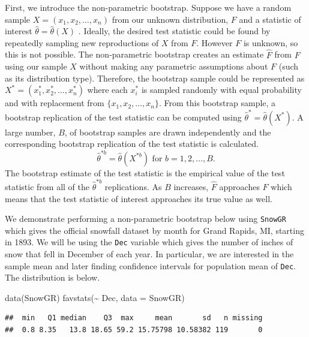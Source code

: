 \documentclass[12pt]{article}
\newenvironment{Shaded}{\begin{snugshade}}{\end{snugshade}}
\newcommand{\AttributeTok}[1]{\textcolor[rgb]{0.77,0.63,0.00}{#1}}
\newcommand{\FunctionTok}[1]{\textcolor[rgb]{0.00,0.00,0.00}{#1}}
\newcommand{\NormalTok}[1]{#1}
\newcommand{\SpecialCharTok}[1]{\textcolor[rgb]{0.00,0.00,0.00}{#1}}
\begin{document}
First, we introduce the non-parametric bootstrap. Suppose we have a
random sample \(X = (x_1,x_2,\dots,x_n)\) from our unknown distribution,
\(F\) and a statistic of interest \(\hat{\theta} = \hat{\theta}(X)\)
\citep{EfronCasi}. Ideally, the desired test statistic could be found by
repeatedly sampling new reproductions of \(X\) from \(F\). However \(F\)
is unknown, so this is not possible. The non-parametric bootstrap
creates an estimate \(\hat{F}\) from \(F\) using our sample \(X\)
without making any parametric assumptions about \(F\) (such as its
distribution type). Therefore, the bootstrap sample could be represented
as \(X^* = (x^*_1, x^*_2, \dots, x^*_n)\) where each \(x^*_i\) is
sampled randomly with equal probability and with replacement from
\(\{x_1,x_2,\dots,x_n\}\). From this bootstrap sample, a bootstrap
replication of the test statistic can be computed using
\(\hat{\theta}^* = \hat{\theta}(X^*)\). A large number, \(B\), of
bootstrap samples are drawn independently and the corresponding
bootstrap replication of the test statistic is calculated.
\[\hat{\theta}^{*b} = \hat{\theta}(X^{*b}) \text{ for } b = 1,2, \dots, B.\]
The bootstrap estimate of the test statistic is the empirical value of
the test statistic from all of the \(\hat{\theta}^{*b}\) replications.
As \(B\) increases, \(\hat{F}\) approaches \(F\) which means that the
test statistic of interest approaches its true value as well.

We demonstrate performing a non-parametric bootstrap below using
\texttt{SnowGR} which gives the official snowfall dataset by month for
Grand Rapids, MI, starting in 1893. We will be using the \texttt{Dec}
variable which gives the number of inches of snow that fell in December
of each year. In particular, we are interested in the sample mean and
later finding confidence intervals for population mean of \texttt{Dec}.
The distribution is below.

\begin{Shaded}
\begin{Highlighting}[]
\FunctionTok{data}\NormalTok{(SnowGR)}
\FunctionTok{favstats}\NormalTok{(}\SpecialCharTok{\textasciitilde{}}\NormalTok{ Dec, }\AttributeTok{data =}\NormalTok{ SnowGR)}
\end{Highlighting}
\end{Shaded}

\begin{verbatim}
##  min   Q1 median    Q3  max     mean       sd   n missing
##  0.8 8.35   13.8 18.65 59.2 15.75798 10.58382 119       0
\end{verbatim}
\end{document}
